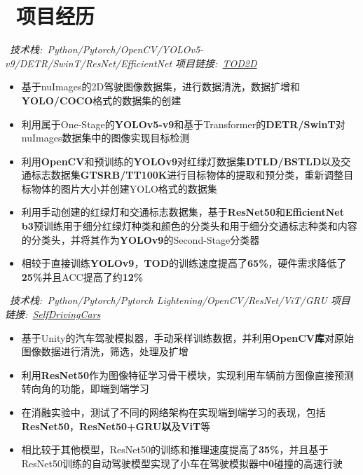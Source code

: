 \documentclass{resume}
\begin{document}
\section{\faFolder\ 项目经历}
\ \textit{技术栈:\ Python/Pytorch/OpenCV/YOLOv5-v9/DETR/SwinT/ResNet/EfficientNet \hfill 项目链接:\ \href{https://github.com/LuckyMax0722/TOD2D}{TOD2D}}
\begin{itemize}
  \item 基于nuImages的2D驾驶图像数据集，进行数据清洗，数据扩增和\textbf{YOLO/COCO}格式的数据集的创建
  \item 利用属于One-Stage的\textbf{YOLOv5-v9}和基于Transformer的\textbf{DETR/SwinT}对nuImages数据集中的图像实现目标检测
  \item 利用\textbf{OpenCV}和预训练的\textbf{YOLOv9}对红绿灯数据集\textbf{DTLD/BSTLD}以及交通标志数据集\textbf{GTSRB/TT100K}进行目标物体的提取和预分类，重新调整目标物体的图片大小并创建YOLO格式的数据集
  \item 利用手动创建的红绿灯和交通标志数据集，基于\textbf{ResNet50}和\textbf{EfficientNet b3}预训练用于细分红绿灯种类和颜色的分类头和用于细分交通标志种类和内容的分类头，并将其作为\textbf{YOLOv9}的Second-Stage分类器
  \item 相较于直接训练\textbf{YOLOv9}，\textbf{TOD}的训练速度提高了\textbf{65\%}，硬件需求降低了\textbf{25\%}并且ACC提高了约\textbf{12\%}
\end{itemize}

\ \textit{技术栈:\ Python/Pytorch/Pytorch Lightening/OpenCV/ResNet/ViT/GRU \hfill 项目链接:\ \href{https://github.com/LuckyMax0722/SelfDrivingCars}{SelfDrivingCars}}
\begin{itemize}
  \item 基于Unity的汽车驾驶模拟器，手动采样训练数据，并利用\textbf{OpenCV库}对原始图像数据进行清洗，筛选，处理及扩增
  \item 利用\textbf{ResNet50}作为图像特征学习骨干模块，实现利用车辆前方图像直接预测转向角的功能，即端到端学习
  \item 在消融实验中，测试了不同的网络架构在实现端到端学习的表现，包括\textbf{ResNet50}，\textbf{ResNet50+GRU以}及\textbf{ViT}等
  \item 相比较于其他模型，ResNet50的训练和推理速度提高了\textbf{35\%}，并且基于ResNet50训练的自动驾驶模型实现了小车在驾驶模拟器中\textbf{0}碰撞的高速行驶
\end{itemize}
\end{document}
